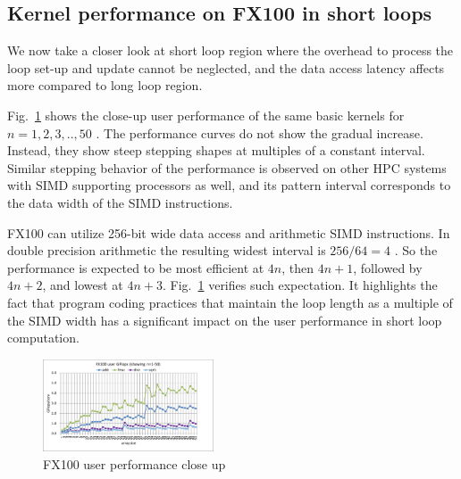 \documentclass[conference]{IEEEtran}
\begin{document}
\subsection{Kernel performance on FX100 in short loops}
\label{subsection:short-kernels-fx100}

We now take a closer look at short loop region where
the overhead to process the loop set-up and update cannot be neglected,
and the data access latency affects more compared to long loop region.

Fig.~\ref{fig:fx100-gflops-short-R8}
shows the close-up user performance of the same basic kernels for
\begin{math}
n=1,2,3,..,50
\end{math}
.
%
The performance curves do not show the gradual increase. Instead, they
show steep stepping shapes at multiples of a constant interval.
Similar stepping behavior of the performance
is observed on other HPC systems with SIMD supporting processors as well,
and its pattern interval corresponds to the data width of the SIMD instructions.

FX100 can utilize 256-bit wide data access and arithmetic SIMD instructions.
In double precision arithmetic the resulting widest interval is
\begin{math}
256 / 64 = 4
\end{math}
.
So the performance is expected to be most efficient at $ 4n $, then $ 4n+1 $,
followed by $ 4n+2 $, and lowest at $ 4n+3 $.
Fig.~\ref{fig:fx100-gflops-short-R8} verifies such expectation.
It highlights the fact that
program coding practices that maintain the loop length as a multiple of
the SIMD width has a significant impact on the user performance
in short loop computation.
\begin{figure}[tb]
\centering
\includegraphics[width=0.45\textwidth]{figs/fx100-gflops-short-R8.pdf}
\caption{FX100 user performance close up}
\label{fig:fx100-gflops-short-R8}
\end{figure}
\end{document}
